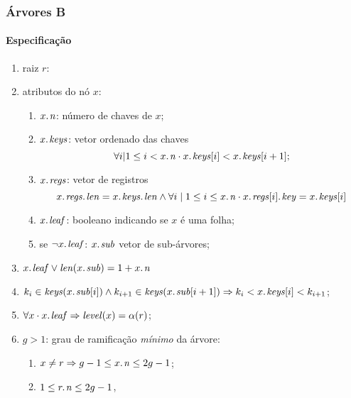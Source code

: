 \documentclass{beamer}
\begin{document}
\begin{frame}

\frametitle{Árvores B}
\framesubtitle{Especificação}

  \begin{enumerate}
  \item raiz $r$:
  \item atributos do nó $x$:
    \begin{enumerate}
    \item $\attrib{x}{n}$: número de chaves de $x$;
    \item $\attrib{x}{keys}$: vetor ordenado das chaves
      $$\forall i | 1 \leq i < \attrib{x}{n} \cdot \attrib{x}{keys}[i] < \attrib{x}{keys}[i+1];$$
    \item $\attrib{x}{regs}$: vetor de registros 
      $$\attrib{\attrib{x}{regs}}{len} = \attrib{\attrib{x}{keys}}{len} \land
      \forall i \mid 1 \le i \le \attrib{x}{n} \cdot \attrib{\attrib{x}{regs}[i]}{key} = \attrib{x}{keys}[i]$$
    \item $\attrib{x}{leaf}$: booleano indicando se $x$ é uma folha;
    \item se $\neg \attrib{x}{leaf}$: $\attrib{x}{sub}$ vetor de sub-árvores;
    \end{enumerate}
  \item $\attrib{x}{leaf} \lor \id{len}(\attrib{x}{sub}) = 1 + \attrib{x}{n}$
  \item $k_i \in \id{keys}(\attrib{x}{sub}[i]) \land k_{i+1} \in \id{keys}(\attrib{x}{sub}[i+1]) \Rightarrow k_i < \attrib{x}{keys}[i] < k_{i+1}$;
  \item $\forall x \cdot \attrib{x}{leaf} \Rightarrow \id{level}(x) = \alpha(r)$;
  \item $g > 1$: grau de ramificação \emph{mínimo} da árvore:
    \begin{enumerate}
    \item $x \neq r \Rightarrow g-1 \le \attrib{x}{n} \le 2g - 1$;
    \item $1 \le \attrib{r}{n} \le 2g - 1$,
    \end{enumerate}
  \end{enumerate}

\end{frame}
\end{document}
